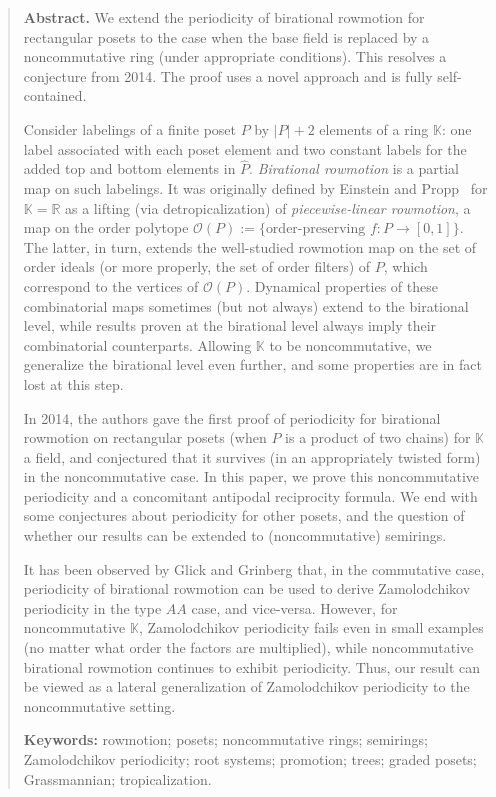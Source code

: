 \documentclass[numbers=enddot,12pt,final,onecolumn,notitlepage]{scrartcl}%
\theoremstyle{definition}
\begin{document}
\begin{abstract}
\textbf{Abstract.} We extend the periodicity of birational rowmotion for
rectangular posets to the case when the base field is replaced by a
noncommutative ring (under appropriate conditions). This resolves a conjecture
from 2014. The proof uses a novel approach and is fully self-contained.

Consider labelings of a finite poset $P$ by $\left\vert P\right\vert + 2$
elements of a ring $\mathbb{K}$: one label associated with each poset element
and two constant labels for the added top and bottom elements in $\widehat{P}%
$. \textit{Birational rowmotion} is a partial map on such labelings. It was
originally defined by Einstein and Propp~\cite{einstein-propp} for
$\mathbb{K}=\mathbb{R}$ as a lifting (via detropicalization) of
\textit{piecewise-linear rowmotion}, a map on the order polytope
$\mathcal{O}(P) := \{\text{order-preserving } f: P \to[0,1]\}$. The latter, in
turn, extends the well-studied rowmotion map on the set of order ideals (or
more properly, the set of order filters) of $P$, which correspond to the
vertices of $\mathcal{O}(P)$. Dynamical properties of these combinatorial maps
sometimes (but not always) extend to the birational level, while results
proven at the birational level always imply their combinatorial counterparts.
Allowing $\mathbb{K}$ to be noncommutative, we generalize the birational level
even further, and some properties are in fact lost at this step.

In 2014, the authors gave the first proof of periodicity for birational
rowmotion on rectangular posets (when $P$ is a product of two chains) for
$\mathbb{K}$ a field, and conjectured that it survives (in an appropriately
twisted form) in the noncommutative case. In this paper, we prove this
noncommutative periodicity and a concomitant antipodal reciprocity formula. We
end with some conjectures about periodicity for other posets, and the question
of whether our results can be extended to (noncommutative) semirings.

It has been observed by Glick and Grinberg that, in the commutative case,
periodicity of birational rowmotion can be used to derive Zamolodchikov
periodicity in the type $AA$ case, and vice-versa. However, for noncommutative
$\mathbb{K}$, Zamolodchikov periodicity fails even in small examples (no
matter what order the factors are multiplied), while noncommutative birational
rowmotion continues to exhibit periodicity. Thus, our result can be viewed as
a lateral generalization of Zamolodchikov periodicity to the noncommutative setting.

\bigskip\noindent\textbf{Keywords:} rowmotion; posets; noncommutative rings;
semirings; Zamolodchikov periodicity; root systems; promotion; trees; graded
posets; Grassmannian; tropicalization.

\end{abstract}
\end{document}
